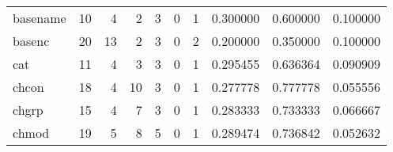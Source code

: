 \begin{tabular}{lrrrrrrrrr}
basename  &                                      10 &                                                  4 &                                                  2 &                                                  3 &                                                  0 &                                                  1 &                                           0.300000 &                               0.600000 &                             0.100000 \\
basenc    &                                      20 &                                                 13 &                                                  2 &                                                  3 &                                                  0 &                                                  2 &                                           0.200000 &                               0.350000 &                             0.100000 \\
cat       &                                      11 &                                                  4 &                                                  3 &                                                  3 &                                                  0 &                                                  1 &                                           0.295455 &                               0.636364 &                             0.090909 \\
chcon     &                                      18 &                                                  4 &                                                 10 &                                                  3 &                                                  0 &                                                  1 &                                           0.277778 &                               0.777778 &                             0.055556 \\
chgrp     &                                      15 &                                                  4 &                                                  7 &                                                  3 &                                                  0 &                                                  1 &                                           0.283333 &                               0.733333 &                             0.066667 \\
chmod     &                                      19 &                                                  5 &                                                  8 &                                                  5 &                                                  0 &                                                  1 &                                           0.289474 &                               0.736842 &                             0.052632 \\

\end{tabular}
